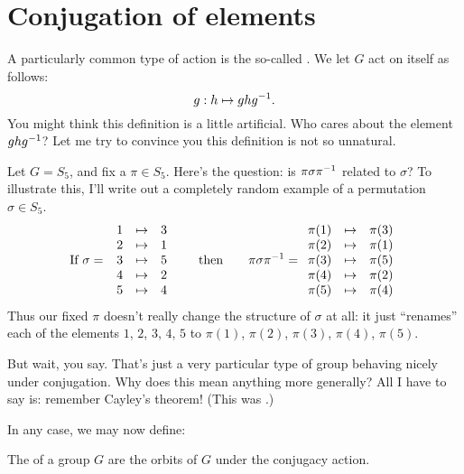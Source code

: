 \section{Conjugation of elements}
A particularly common type of action is the so-called .
We let $G$ act on itself as follows:
\[ g : h \mapsto ghg^{-1}. \]
You might think this definition is a little artificial.
Who cares about the element $ghg^{-1}$?
Let me try to convince you this definition is not so unnatural.
\begin{example}
	[Conjugacy in $S_n$]
	Let $G = S_5$, and fix a $\pi \in S_5$.
	Here's the question: is $\pi \sigma \pi ^{-1}$ related to $\sigma$?
	To illustrate this,
	I'll write out a completely random example of a permutation $\sigma \in S_5$.
	\[
		\text{If }
		\sigma = \;
		\begin{array}{ccc}
		1 & \mapsto & 3 \\
		2 & \mapsto & 1 \\
		3 & \mapsto & 5 \\
		4 & \mapsto & 2 \\
		5 & \mapsto & 4
		\end{array}
		\qquad
		\text{then}
		\qquad
		\pi \sigma \pi^{-1} = 
		\begin{array}{ccc}
		\pi(1) & \mapsto & \pi(3) \\
		\pi(2) & \mapsto & \pi(1) \\
		\pi(3) & \mapsto & \pi(5) \\
		\pi(4) & \mapsto & \pi(2) \\
		\pi(5) & \mapsto & \pi(4)
		\end{array}
	\]
	Thus our fixed $\pi$ doesn't really change the structure of $\sigma$ at all:
	it just ``renames'' each of the elements $1$, $2$, $3$, $4$, $5$
	to $\pi(1)$, $\pi(2)$, $\pi(3)$, $\pi(4)$, $\pi(5)$.
\end{example}
But wait, you say.
That's just a very particular type of group behaving nicely under conjugation.
Why does this mean anything more generally?
All I have to say is: remember Cayley's theorem!
(This was .)

In any case, we may now define:
\begin{definition}
	The  of a group $G$ are the orbits of $G$ under
	the conjugacy action.
\end{definition}


